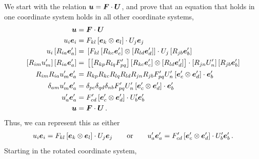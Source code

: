 \documentclass[10pt,letterpaper,oneside]{report}
\newcommand{\ten}[1]{\mbox{\boldmath $#1$}{}}
\begin{document}
We start with the relation $\ten{u} = \ten{F} \cdot \ten{U}$, and prove that an equation that holds in one coordinate system holds in all other coordinate systems,
\begin{align}
\ten{u} ={}& \ten{F} \cdot \ten{U} 
\notag \\
u_i \ten{e}_i ={}& F_{kl} \left[ \ten{e}_k \otimes \ten{e}_l \right] \cdot U_j \ten{e}_j 
\notag \\
u_i \left[ R_{ia} \ten{e}'_a \right] ={}& \left[ F_{kl} \left[ R_{kc} \ten{e}'_c \right] \otimes \left[ R_{ld} \ten{e}'_d \right] \right] \cdot U_j \left[ R_{jb} \ten{e}'_b \right] 
\notag \\
\left[ R_{im} u'_m \right] \left[ R_{ia} \ten{e}'_a \right] ={}& \left[ \left[ R_{kp} R_{lq} F'_{pq} \right] \left[ R_{kc} \ten{e}'_c \right] \otimes \left[ R_{ld} \ten{e}'_d \right] \right] \cdot \left[ R_{jn} U'_n \right] \left[ R_{jb} \ten{e}'_b \right] 
\notag \\
R_{im} R_{ia} u'_m \ten{e}'_a ={}& R_{kp} R_{kc} R_{lq} R_{ld} R_{jn} R_{jb} F'_{pq} U'_n \left[ \ten{e}'_c \otimes \ten{e}'_d \right] \cdot \ten{e}'_b 
\\
\delta_{am} u'_m \ten{e}'_a ={}& \delta_{pc} \delta_{qd} \delta_{nb} F'_{pq} U'_n \left[ \ten{e}'_c \otimes \ten{e}'_d \right] \cdot \ten{e}'_b 
\notag \\
u'_a \ten{e}'_a ={}& F'_{cd} \left[ \ten{e}'_c \otimes \ten{e}'_d \right] \cdot U'_b \ten{e}'_b 
\notag \\
\ten{u} ={}& \ten{F} \cdot \ten{U} \, . 
\notag
\end{align}
Thus, we can represent this as either
\begin{align}
u_i \ten{e}_i = F_{kl} \left[ \ten{e}_k \otimes \ten{e}_l \right] \cdot U_j \ten{e}_j 
\qquad \text{or} \qquad 
u'_a \ten{e}'_a = F'_{cd} \left[ \ten{e}'_c \otimes \ten{e}'_d \right] \cdot U'_b \ten{e}'_b \, . 
\end{align}
Starting in the rotated coordinate system, 
\end{document}
